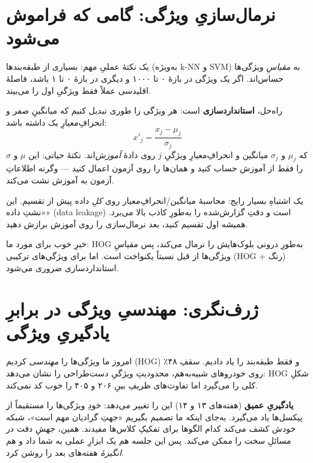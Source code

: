 \documentclass[12pt,a4paper]{article}
\begin{document}
\section{نرمال‌سازیِ ویژگی: گامی که فراموش می‌شود}

یک نکتهٔ عملیِ مهم: بسیاری از طبقه‌بندها (به‌ویژه k-NN و SVM) به \emph{مقیاسِ} ویژگی‌ها حساس‌اند. اگر یک ویژگی در بازهٔ ۰ تا ۱۰۰۰ و دیگری در بازهٔ ۰ تا ۱ باشد، فاصلهٔ اقلیدسی عملاً فقط ویژگیِ اول را می‌بیند.

\begin{riyazi}
راه‌حل، \textbf{استانداردسازی} است: هر ویژگی را طوری تبدیل کنیم که میانگینِ صفر و انحرافِ‌معیارِ یک داشته باشد:
\[
x'_j = \frac{x_j - \mu_j}{\sigma_j}
\]
که $\mu_j$ و $\sigma_j$ میانگین و انحرافِ‌معیارِ ویژگیِ $j$ روی دادهٔ \emph{آموزش}‌اند. نکتهٔ حیاتی: این $\mu$ و $\sigma$ را فقط از آموزش حساب کنید و همان‌ها را روی آزمون اعمال کنید — وگرنه اطلاعاتِ آزمون به آموزش نشت می‌کند.
\end{riyazi}

\begin{hoshdar}
یک اشتباهِ بسیار رایج: محاسبهٔ میانگین/انحرافِ‌معیار روی \emph{کلِ} داده پیش از تقسیم. این «نشتِ داده» (data leakage) است و دقتِ گزارش‌شده را به‌طورِ کاذب بالا می‌برد. همیشه اول تقسیم کنید، بعد نرمال‌سازی را روی آموزش برازش دهید.
\end{hoshdar}

خبرِ خوب برای مورد ما: HOG به‌طورِ درونی بلوک‌هایش را نرمال می‌کند، پس مقیاسِ ویژگی‌ها از قبل نسبتاً یکنواخت است. اما برای ویژگی‌های ترکیبی (HOG + رنگ) استانداردسازی ضروری می‌شود.

\section{ژرف‌نگری: مهندسیِ ویژگی در برابرِ یادگیریِ ویژگی}

امروز ما ویژگی‌ها را \emph{مهندسی} کردیم (HOG) و فقط طبقه‌بند را یاد دادیم. سقفِ ۴۸٪ روی خودروهای شبیه‌به‌هم، محدودیتِ ویژگیِ دست‌طراحی را نشان می‌دهد: HOG شکلِ کلی را می‌گیرد اما تفاوت‌های ظریفِ بینِ ۲۰۶ و ۴۰۵ را خوب کد نمی‌کند.

\begin{nokte}
\textbf{یادگیریِ عمیق} (هفته‌های ۱۳ و ۱۴) این را تغییر می‌دهد: خودِ ویژگی‌ها را مستقیماً از پیکسل‌ها یاد می‌گیرد. به‌جای اینکه ما تصمیم بگیریم «جهتِ گرادیان مهم است»، شبکه خودش کشف می‌کند کدام الگوها برای تفکیکِ کلاس‌ها مفیدند. همین، جهشِ دقت در مسائلِ سخت را ممکن می‌کند. پس این جلسه هم یک ابزارِ عملی به شما داد و هم \emph{انگیزهٔ} هفته‌های بعد را روشن کرد.
\end{nokte}
\end{document}
